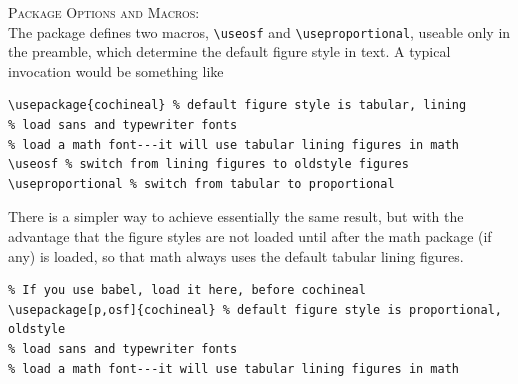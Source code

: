 \documentclass[11pt]{article}
\begin{document}
\newpage
\textsc{Package Options and Macros:}\\
The package defines two macros, \verb|\useosf| and \verb|\useproportional|, useable only in the preamble, which determine the default figure style in text. A typical invocation would be something like
\begin{verbatim}
\usepackage{cochineal} % default figure style is tabular, lining
% load sans and typewriter fonts
% load a math font---it will use tabular lining figures in math
\useosf % switch from lining figures to oldstyle figures
\useproportional % switch from tabular to proportional
\end{verbatim}
There is a simpler way to achieve essentially the same result, but with the advantage that the figure styles are not loaded until after the math package (if any) is loaded, so that math always uses the default tabular lining figures. 
\begin{verbatim}
% If you use babel, load it here, before cochineal
\usepackage[p,osf]{cochineal} % default figure style is proportional, oldstyle
% load sans and typewriter fonts
% load a math font---it will use tabular lining figures in math
\end{verbatim}
\end{document}
